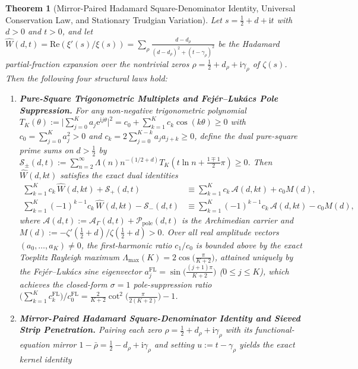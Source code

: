 \documentclass[11pt,reqno]{amsart}
\newtheorem{theorem}{Theorem}[section]
\theoremstyle{definition}
\theoremstyle{remark}
\numberwithin{equation}{section}
\newcommand{\ee}{\mathrm{e}}
\newcommand{\ii}{\mathrm{i}}
\newcommand{\Rea}{\mathrm{Re}}
\begin{document}
\begin{theorem}[Mirror-Paired Hadamard Square-Denominator Identity, Universal Conservation Law, and Stationary Trudgian Variation]\label{thm:main}
Let $s = \frac{1}{2} + d + \ii t$ with $d > 0$ and $t > 0$, and let $\widehat{W}(d,t) = \Rea(\xi'(s)/\xi(s)) = \sum_{\rho} \frac{d - d_\rho}{(d - d_\rho)^2 + (t - \gamma_\rho)^2}$ be the Hadamard partial-fraction expansion over the nontrivial zeros $\rho = \frac{1}{2} + d_\rho + \ii\gamma_\rho$ of $\zeta(s)$. Then the following four structural laws hold:
\begin{enumerate}[label=\textup{(\roman*)},leftmargin=2.2em]
\item \textbf{Pure-Square Trigonometric Multiplets and Fej\'er--Luk\'acs Pole Suppression.} For any non-negative trigonometric polynomial $T_K(\theta) := \bigl|\sum_{j=0}^K a_j \ee^{\ii j\theta}\bigr|^2 = c_0 + \sum_{k=1}^K c_k \cos(k\theta) \ge 0$ with $c_0 = \sum_{j=0}^K a_j^2 > 0$ and $c_k = 2\sum_{j=0}^{K-k} a_j a_{j+k} \ge 0$, define the dual pure-square prime sums on $d > \frac{1}{2}$ by $\mathcal{S}_\pm(d,t) := \sum_{n=2}^{\infty} \Lambda(n)n^{-(1/2+d)}T_K(t\ln n + \frac{1\mp 1}{2}\pi) \ge 0$. Then $\widehat{W}(d,kt)$ satisfies the exact dual identities
\begin{equation}\label{eq:intro_pure_square}
\begin{aligned}
\sum_{k=1}^K c_k\,\widehat{W}(d,kt) + \mathcal{S}_+(d,t) &\equiv \sum_{k=1}^K c_k\,\mathcal{A}(d,kt) + c_0 M(d), \\
\sum_{k=1}^K (-1)^{k-1} c_k\,\widehat{W}(d,kt) - \mathcal{S}_-(d,t) &\equiv \sum_{k=1}^K (-1)^{k-1} c_k\,\mathcal{A}(d,kt) - c_0 M(d),
\end{aligned}
\end{equation}
where $\mathcal{A}(d,t) := \mathcal{A}_\Gamma(d,t) + \mathcal{P}_{\mathrm{pole}}(d,t)$ is the Archimedian carrier and $M(d) := -\zeta'(\frac{1}{2}+d)/\zeta(\frac{1}{2}+d) > 0$. Over all real amplitude vectors $(a_0, \dots, a_K) \neq 0$, the first-harmonic ratio $c_1/c_0$ is bounded above by the exact Toeplitz Rayleigh maximum $\Lambda_{\max}(K) = 2\cos\bigl(\frac{\pi}{K+2}\bigr)$, attained uniquely by the Fej\'er--Luk\'acs sine eigenvector $a_j^{\mathrm{FL}} = \sin\bigl(\frac{(j+1)\pi}{K+2}\bigr)$ ($0 \le j \le K$), which achieves the closed-form $\sigma = 1$ pole-suppression ratio $\bigl(\sum_{k=1}^K c_k^{\mathrm{FL}}\bigr)/c_0^{\mathrm{FL}} = \frac{2}{K+2}\cot^2\bigl(\frac{\pi}{2(K+2)}\bigr) - 1$.
\item \textbf{Mirror-Paired Hadamard Square-Denominator Identity and Sieved Strip Penetration.} Pairing each zero $\rho = \frac{1}{2} + d_\rho + \ii\gamma_\rho$ with its functional-equation mirror $1 - \bar{\rho} = \frac{1}{2} - d_\rho + \ii\gamma_\rho$ and setting $u := t - \gamma_\rho$ yields the exact kernel identity

\end{enumerate}
\end{theorem}
\end{document}
